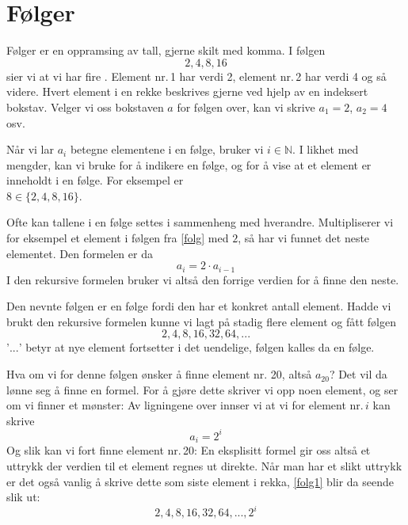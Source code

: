 




\section{Følger}
Følger er en oppramsing av tall, gjerne skilt med komma. I følgen 
\begin{equation}
2, 4, 8, 16  \label{folg}
\end{equation}
sier vi at vi har fire . Element nr.\,1 har verdi 2, element nr.\,2 har verdi 4 og så videre. Hvert element i en rekke beskrives gjerne ved hjelp av en indeksert bokstav. Velger vi oss bokstaven $ a $ for følgen over, kan vi skrive $ {a_1 =2} $, $ {a_2=4} $ osv.\vsk

Når vi lar $ a_i $ betegne elementene i en følge, bruker vi $ {i\in \mathbb{N}}$. I likhet med mengder, kan vi bruke \sym{$ \lbrace\rbrace $} for å indikere en følge, og \sym{$ \in $} for å vise at et element er inneholdt i en følge. For eksempel er \\$ 8\in\lbrace2, 4, 8, 16\rbrace $. \vsk

Ofte kan tallene i en følge settes i sammenheng med hverandre. Multipliserer vi for eksempel et element i følgen fra \eqref{folg} med $ 2 $, så har vi funnet det neste elementet. Den  formelen er da
\[ a_i = 2\cdot a_{i-1} \]
I den rekursive formelen bruker vi altså den forrige verdien for å finne den neste. \vsk

Den nevnte følgen er en  følge fordi den har et konkret antall element. Hadde vi brukt den rekursive formelen kunne vi lagt på stadig flere element og fått følgen
\begin{equation}
 2, 4, 8, 16, 32, 64, ...  \label{folg1}
\end{equation}
'$ ... $' betyr at nye element fortsetter i det uendelige, følgen kalles da en  følge. \vsk

Hva om vi for denne følgen ønsker å finne element nr. 20, altså $ a_{20} $? Det vil da lønne seg å finne en  formel. For å gjøre dette skriver vi opp noen element, og ser om vi finner et mønster: 
Av ligningene over innser vi at vi for element nr.\,$ i $ kan skrive
\[ a_i=2^i \] 
Og slik kan vi fort finne element nr.\,20:
En eksplisitt formel gir oss altså et uttrykk der verdien til et element regnes ut direkte. Når man har et slikt uttrykk er det også vanlig å skrive dette som siste element i rekka, \eqref{folg1} blir da seende slik ut:
\[  2, 4, 8, 16, 32, 64, ..., 2^i \]
